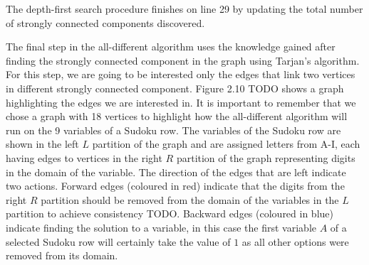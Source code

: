 \documentclass{l4proj}
\begin{document}
\noindent The depth-first search procedure finishes on line 29 by updating the total number of strongly connected components discovered.

\noindent The final step in the all-different algorithm uses the knowledge gained after finding the strongly connected component in the graph using Tarjan’s algorithm. For this step, we are going to be interested only the edges that link two vertices in different strongly connected component. Figure 2.10 TODO shows a graph highlighting the edges we are interested in. It is important to remember that we chose a graph with 18 vertices to highlight how the all-different algorithm will run on the 9 variables of a Sudoku row. The variables of the Sudoku row are shown in the left $L$ partition of the graph and are assigned letters from A-I, each having edges to vertices in the right $R$ partition of the graph representing digits in the domain of the variable. The direction of the edges that are left indicate two actions. Forward edges (coloured in red) indicate that the digits from the right $R$ partition should be removed from the domain of the variables in the $L$ partition to achieve consistency TODO. Backward edges (coloured in blue) indicate finding the solution to a variable, in this case the first variable $A$ of a selected Sudoku row will certainly take the value of $1$ as all other options were removed from its domain.
\end{document}
